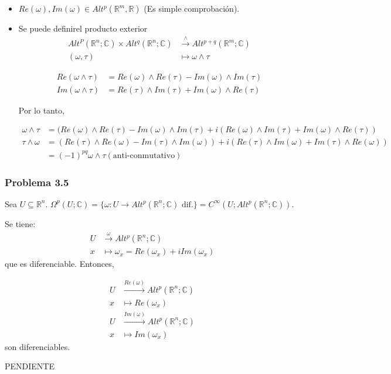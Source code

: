 \begin{itemize}
\item $Re(\omega),Im(\omega) \in Alt^p(\mathbb{R}^m,\mathbb{R})$ (Es simple comprobación).

\item Se puede definirel producto exterior
  \begin{equation}
    \begin{split}
      Alt^P(\mathbb{R}^n;\mathbb{C})\times Alt^q(\mathbb{R}^n;\mathbb{C})&\xrightarrow{\wedge} Alt^{p+q}(\mathbb{R}^m;\mathbb{C}) \\
      (\omega,\tau) &\mapsto \omega \wedge \tau
    \end{split}
  \end{equation}

  \begin{equation}
    \begin{split}
      Re(\omega \wedge \tau) &= Re(\omega)\wedge Re(\tau) - Im(\omega)\wedge Im(\tau) \\
      Im(\omega \wedge \tau) &= Re(\tau)\wedge Im(\tau) + Im(\omega)\wedge Re(\tau)
    \end{split}
  \end{equation}

  Por lo tanto,

  \begin{equation}
    \begin{split}
      \omega\wedge \tau &= (Re(\omega)\wedge Re(\tau)-Im(\omega)\wedge Im(\tau)+i(Re(\omega)\wedge Im(\tau) + Im(\omega)\wedge Re(\tau)) \\
      \tau\wedge \omega &= (Re(\tau)\wedge Re(\omega)-Im(\tau)\wedge Im(\omega))+i(Re(\tau)\wedge Im(\omega) + Im(\tau) \wedge Re(\omega)) \\
      &= (-1)^{pq}\omega\wedge \tau (\text{anti-conmutativo})
    \end{split}
  \end{equation}
\end{itemize}


\subsubsection{Problema 3.5}

Sea $U\subseteq \mathbb{R}^n$. $\Omega^p(U;\mathbb{C})=\{\omega:U\rightarrow Alt^p(\mathbb{R}^n;\mathbb{C}) \text{ dif.}\}=C^\infty(U;Alt^p(\mathbb{R}^n;\mathbb{C}))$.

Se tiene:
\begin{equation}
  \begin{split}
    U &\xrightarrow{\omega}Alt^p(\mathbb{R}^n;\mathbb{C}) \\
    x &\mapsto \omega_x=Re(\omega_x)+i Im(\omega_x)
  \end{split}
\end{equation}
que es diferenciable. Entonces,

\begin{equation}
  \begin{split}
     U &\xrightarrow{Re(\omega)}Alt^p(\mathbb{R}^n;\mathbb{C}) \\
     x &\mapsto Re(\omega_x) \\
     U &\xrightarrow{Im(\omega)}Alt^p(\mathbb{R}^n;\mathbb{C}) \\
    x &\mapsto Im(\omega_x)
  \end{split}
\end{equation}
son diferenciables.

PENDIENTE